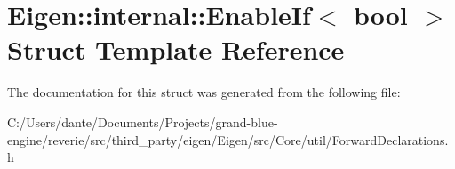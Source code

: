 \hypertarget{struct_eigen_1_1internal_1_1_enable_if}{}\section{Eigen\+::internal\+::Enable\+If$<$ bool $>$ Struct Template Reference}
\label{struct_eigen_1_1internal_1_1_enable_if}


The documentation for this struct was generated from the following file\+:\begin{DoxyCompactItemize}
\item 
C\+:/\+Users/dante/\+Documents/\+Projects/grand-\/blue-\/engine/reverie/src/third\+\_\+party/eigen/\+Eigen/src/\+Core/util/Forward\+Declarations.\+h\end{DoxyCompactItemize}
